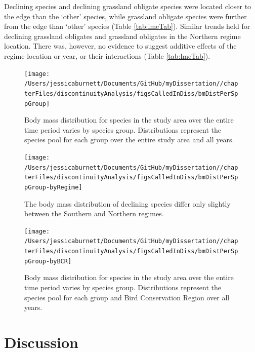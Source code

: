 \documentclass[12pt,twoside,openany]{reedthesis}
\begin{document}
Declining species and declining grassland obligate species were located closer to the edge than the `other' species, while grassland obligate species were further from the edge than `other' species (Table \ref{tab:lmeTab}). Similar trends held for declining grassland obligates and grassland obligates in the Northern regime location. There was, however, no evidence to suggest additive effects of the regime location or year, or their interactions (Table \ref{tab:lmeTab}).
\begin{figure}[bth]

{\centering \texttt{[image: /Users/jessicaburnett/Documents/GitHub/myDissertation//chapterFiles/discontinuityAnalysis/figsCalledInDiss/bmDistPerSppGroup]} 

}

\caption{Body mass distribution for species in the study area over the entire time period varies by species group. Distributions represent the species pool for each group over the entire study area and all years.}\label{fig:bmDistPerSppGroup}
\end{figure}
\begin{figure}[bth]

{\centering \texttt{[image: /Users/jessicaburnett/Documents/GitHub/myDissertation//chapterFiles/discontinuityAnalysis/figsCalledInDiss/bmDistPerSppGroup-byRegime]} 

}

\caption{The body mass distribution of declining species differ only slightly between the Southern and Northern regimes.}\label{fig:bmDistPerSppGroup-byRegime}
\end{figure}
\begin{figure}[bth]

{\centering \texttt{[image: /Users/jessicaburnett/Documents/GitHub/myDissertation//chapterFiles/discontinuityAnalysis/figsCalledInDiss/bmDistPerSppGroup-byBCR]} 

}

\caption{Body mass distribution for species in the study area over the entire time period varies by species group. Distributions represent the species pool for each group and Bird Conservation Region over all years.}\label{fig:bmDistPerSppGroup-byBCR}
\end{figure}
\hypertarget{discussion-4}{%
\section{Discussion}\label{discussion-4}}
\end{document}

